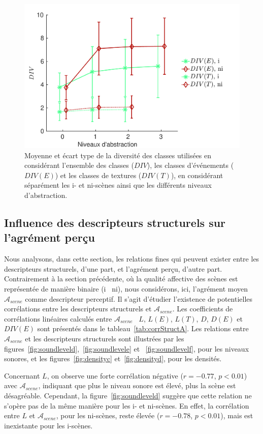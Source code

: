 \begin{figure}[t]
        \myfloatalign
        \includegraphics[width=.8\linewidth]{gfx/ch_5/xp1_div_1}
       \caption{Moyenne et écart type de la diversité des classes utilisées en considérant l'ensemble des classes ($DIV$), les classes d'événements ($DIV(E)$) et les classes de textures ($DIV(T)$), en considérant séparément les i- et ni-scènes ainsi que les différents niveaux d'abstraction.}\label{fig:diversity}
\end{figure}

\subsection{Influence des descripteurs structurels sur l'agrément perçu}
\label{sec:ch5_corrDesStruct}

Nous analysons, dans cette section, les relations fines qui peuvent exister entre les descripteurs structurels, d'une part, et l'agrément perçu, d'autre part. Contrairement à la section précédente, où la qualité affective des scènes est représentée de manière binaire (i \vs~ni), nous considérons, ici, l'agrément moyen $\mathcal{A}_{scene}$ comme descripteur perceptif. Il s'agit d'étudier l'existence de potentielles corrélations entre les descripteurs structurels et $\mathcal{A}_{scene}$. Les coefficients de corrélations linéaires calculés entre $\mathcal{A}_{scene}$ \vs~$L$, $L(E)$, $L(T)$, $D$, $D(E)$ et $DIV(E)$ sont présentés dans le tableau~\ref{tab:corrStructA}. Les relations entre $\mathcal{A}_{scene}$ et les descripteurs structurels sont illustrées par les figures~\ref{fig:soundleveld},~\ref{fig:soundlevele} et ~\ref{fig:soundlevelf}, pour les niveaux sonores, et les figures~\ref{fig:densityc} et~\ref{fig:densityd}, pour les densités. 

Concernant $L$, on observe une forte corrélation négative ($r=-0.77$, $p<0.01$) avec $\mathcal{A}_{scene}$, indiquant que plus le niveau sonore est élevé, plus la scène est désagréable. Cependant, la figure~\ref{fig:soundleveld} suggère que cette relation ne s'opère pas de la même manière pour les i- et ni-scènes. En effet, la corrélation entre $L$ et $\mathcal{A}_{scene}$, pour les ni-scènes, reste élevée ($r=-0.78$, $p<0.01$), mais est inexistante pour les i-scènes. 

